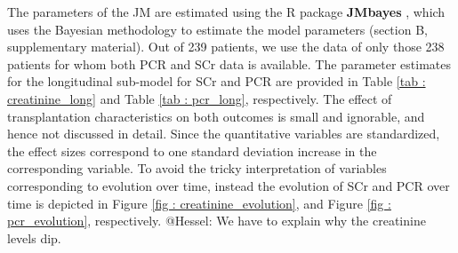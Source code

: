 The parameters of the JM are estimated using the R package \textbf{JMbayes} \citep{rizopoulosJMbayes}, which uses the Bayesian methodology to estimate the model parameters (section B, supplementary material). Out of 239 patients, we use the data of only those 238 patients for whom both PCR and SCr data is available. The parameter estimates for the longitudinal sub-model for SCr and PCR are provided in Table \ref{tab : creatinine_long} and Table \ref{tab : pcr_long}, respectively. The effect of transplantation characteristics on both outcomes is small and ignorable, and hence not discussed in detail. Since the quantitative variables are standardized, the effect sizes correspond to one standard deviation increase in the corresponding variable. To avoid the tricky interpretation of variables corresponding to evolution over time, instead the evolution of SCr and PCR over time is depicted in Figure \ref{fig : creatinine_evolution}, and Figure \ref{fig : pcr_evolution}, respectively.
@Hessel: We have to explain why the creatinine levels dip. 

